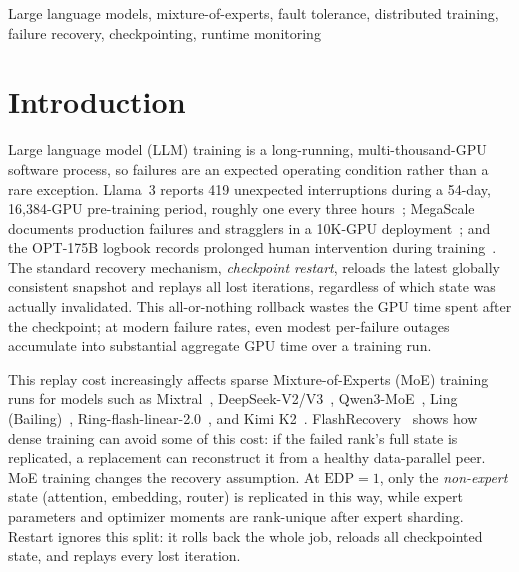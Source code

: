 \documentclass[10pt,conference]{IEEEtran}
\begin{document}
\begin{IEEEkeywords}
Large language models, mixture-of-experts, fault tolerance, distributed training, failure recovery, checkpointing, runtime monitoring
\end{IEEEkeywords}

\section{Introduction}
\label{sec:intro}

Large language model (LLM) training is a long-running, multi-thousand-GPU software process, so failures are an expected operating condition rather than a rare exception. Llama~3 reports 419 unexpected interruptions during a 54-day, 16{,}384-GPU pre-training period, roughly one every three hours~\cite{dubey2024llama3}; MegaScale documents production failures and stragglers in a 10K-GPU deployment~\cite{jiang2024megascale}; and the OPT-175B logbook records prolonged human intervention during training~\cite{zhang2022opt}. The standard recovery mechanism, \emph{checkpoint restart}, reloads the latest globally consistent snapshot and replays all lost iterations, regardless of which state was actually invalidated. This all-or-nothing rollback wastes the GPU time spent after the checkpoint; at modern failure rates, even modest per-failure outages accumulate into substantial aggregate GPU time over a training run.

This replay cost increasingly affects sparse Mixture-of-Experts (MoE) training runs for models such as Mixtral~\cite{jiang2024mixtral}, DeepSeek-V2/V3~\cite{deepseekv2,deepseekv3}, Qwen3-MoE~\cite{qwen3report}, Ling (Bailing)~\cite{ling2025bailing}, Ring-flash-linear-2.0~\cite{ling2025ringlinear}, and Kimi K2~\cite{kimi2025k2}. FlashRecovery~\cite{zhang2025flashrecovery} shows how dense training can avoid some of this cost: if the failed rank's full state is replicated, a replacement can reconstruct it from a healthy data-parallel peer. MoE training changes the recovery assumption. At $\text{EDP}=1$, only the \emph{non-expert} state (attention, embedding, router) is replicated in this way, while expert parameters and optimizer moments are rank-unique after expert sharding. Restart ignores this split: it rolls back the whole job, reloads all checkpointed state, and replays every lost iteration.
\end{document}
